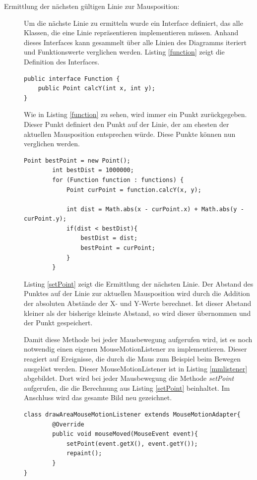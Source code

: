 \begin{description}
\item[Ermittlung der nächsten gültigen Linie zur Mausposition:] Um die nächste Linie zu ermitteln wurde ein Interface definiert, das alle Klassen, die eine Linie repräsentieren implementieren müssen. Anhand dieses Interfaces kann gesammelt über alle Linien des Diagramms iteriert und Funktionswerte verglichen werden. Listing \ref{function} zeigt die Definition des Interfaces.
\begin{lstlisting}[captionpos=b, caption=Interface für die Linien, label=function]
public interface Function {
    public Point calcY(int x, int y);
}
\end{lstlisting}

Wie in Listing \ref{function} zu sehen, wird immer ein Punkt zurückgegeben. Dieser Punkt definiert den Punkt auf der Linie, der am ehesten der aktuellen Mausposition entsprechen würde. Diese Punkte können nun verglichen werden.
\begin{lstlisting}[captionpos=b, caption=Methode zum ermitteln des nächsten Punktes, label=setPoint]
Point bestPoint = new Point();
        int bestDist = 1000000;
        for (Function function : functions) {
            Point curPoint = function.calcY(x, y);

            int dist = Math.abs(x - curPoint.x) + Math.abs(y -curPoint.y);
            if(dist < bestDist){
                bestDist = dist;
                bestPoint = curPoint;
            }
        }
\end{lstlisting}

Listing \ref{setPoint} zeigt die Ermittlung der nächsten Linie. Der Abstand des Punktes auf der Linie zur aktuellen Mausposition wird durch die Addition der absoluten Abstände der X- und Y-Werte berechnet. Ist dieser Abstand kleiner als der bisherige kleinste Abstand, so wird dieser übernommen und der Punkt gespeichert. 

Damit diese Methode bei jeder Mausbewegung aufgerufen wird, ist es noch notwendig einen eigenen MouseMotionListener zu implementieren. Dieser reagiert auf Ereignisse, die durch die Maus zum Beispiel beim Bewegen ausgelöst werden. Dieser MouseMotionListener ist in Listing \ref{mmlistener} abgebildet. Dort wird bei jeder Mausbewegung die Methode \emph{setPoint} aufgerufen, die die Berechnung aus Listing \ref{setPoint} beinhaltet. Im Anschluss wird das gesamte Bild neu gezeichnet.
\begin{lstlisting}[captionpos=b, caption=MouseMotionListener, label=mmlistener]
class drawAreaMouseMotionListener extends MouseMotionAdapter{
        @Override
        public void mouseMoved(MouseEvent event){
            setPoint(event.getX(), event.getY());
            repaint();
        }
}
\end{lstlisting}


\end{description}
